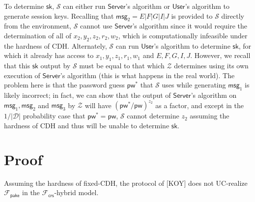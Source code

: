 \documentclass[12pt,a4paper]{article}
\newcommand{\simulator}{\mathcal{S}}
\newcommand{\env}{\mathcal{Z}}
\newcommand{\user}{\mathsf{User}}
\newcommand{\sk}{\mathsf{sk}}
\newcommand{\pw}{\mathsf{pw}}
\newcommand{\server}{\mathsf{Server}}
\newcommand{\msg}[1]{\mathsf{msg}_{#1}}
\def\xjy#1{\textcolor{blue}{Jiayu: #1}}
\begin{document}
	To determine $\sk$, $\simulator$ can either run $\server$'s algorithm or $\user$'s algorithm to generate session keys. Recalling that $\msg{2} = E|F|G|I|J$ is provided to $\simulator$ directly from the environment, $\simulator$ cannot use $\server$'s algorithm since it would require the determination of all of $x_2, y_2, z_2, r_2, w_2$, which is computationally infeasible under the hardness of CDH. Alternately, $\simulator$ can run $\user$'s algorithm to determine $\sk$, for which it already has access to $x_1,y_1,z_1,r_1,w_1$ and $E,F,G,I,J$. However, we recall that this $\sk$ output by $\simulator$ must be equal to that which $\env$ determines using its own execution of $\server$'s algorithm (this is what happens in the real world). The problem here is that the password guess $\pw^*$ that $\simulator$ uses while generating $\msg{1}$ is likely incorrect; in fact, we can show that the output of $\server$'s algorithm on $\msg{1},\msg{2}$ and $\msg{3}$ by $\env$ will have $(\pw^{*}/\pw)^{z_2}$ as a factor, and except in the $1/\mathcal{|D|}$ probability case that $\pw^*=\pw$, $\simulator$ cannot determine $z_2$ assuming the hardness of CDH and thus will be unable to determine $\sk$.\\
	
	\section{Proof}


	\begin{theorem}
		Assuming the hardness of fixed-CDH, the protocol of [KOY] does not UC-realize $\mathcal{F}_\mathsf{pake}$ in the $\mathcal{F}_{\mathsf{crs}}$-hybrid model.
	\end{theorem}
\end{document}
